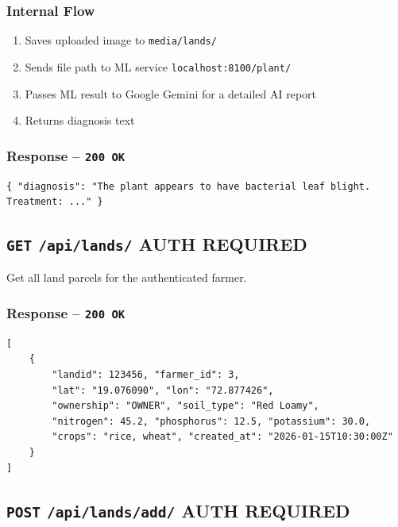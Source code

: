 \documentclass[11pt,a4paper]{article}
\newcommand{\authbadge}{\textcolor{lockgold}{\textbf{AUTH REQUIRED}}}
\newcommand{\httpmethod}[1]{\texttt{\textbf{#1}}}
\begin{document}
\subsubsection*{Internal Flow}
\begin{enumerate}[noitemsep]
    \item Saves uploaded image to \texttt{media/lands/}
    \item Sends file path to ML service \texttt{localhost:8100/plant/}
    \item Passes ML result to Google Gemini for a detailed AI report
    \item Returns diagnosis text
\end{enumerate}

\subsubsection*{Response -- \texttt{200 OK}}
\begin{lstlisting}[style=jsonStyle]
{ "diagnosis": "The plant appears to have bacterial leaf blight. Treatment: ..." }
\end{lstlisting}

\subsection{\httpmethod{GET} \texttt{/api/lands/} \hfill \authbadge}

Get all land parcels for the authenticated farmer.

\subsubsection*{Response -- \texttt{200 OK}}
\begin{lstlisting}[style=jsonStyle]
[
    {
        "landid": 123456, "farmer_id": 3,
        "lat": "19.076090", "lon": "72.877426",
        "ownership": "OWNER", "soil_type": "Red Loamy",
        "nitrogen": 45.2, "phosphorus": 12.5, "potassium": 30.0,
        "crops": "rice, wheat", "created_at": "2026-01-15T10:30:00Z"
    }
]
\end{lstlisting}

\subsection{\httpmethod{POST} \texttt{/api/lands/add/} \hfill \authbadge}
\end{document}
